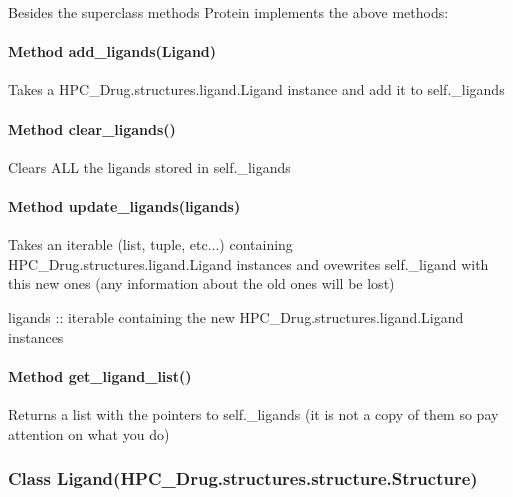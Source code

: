 		Besides the superclass methods Protein implements the above methods:
		
		\paragraph{Method add\_ligands(Ligand)}
		
			Takes a HPC\_Drug.structures.ligand.Ligand instance and add it to self.\_ligands

		\paragraph{Method clear\_ligands()}

            Clears ALL the ligands stored in self.\_ligands

        \paragraph{Method update\_ligands(ligands)}
        
            Takes an iterable (list, tuple, etc...) containing HPC\_Drug.structures.ligand.Ligand 
            instances and ovewrites self.\_ligand with this new ones (any information about the old ones will be lost)
            
            ligands :: iterable containing the new HPC\_Drug.structures.ligand.Ligand instances

			
		\paragraph{Method get\_ligand\_list()}
		
			Returns a list with the pointers to self.\_ligands (it is not a copy of them so pay attention on what you do)

	\subsubsection{Class Ligand(HPC\_Drug.structures.structure.Structure)}
	
